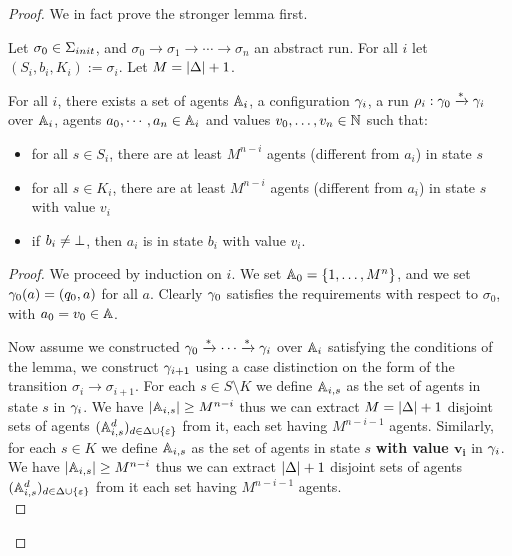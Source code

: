 \ifproofs
\begin{proof}

We in fact prove the stronger lemma first.

\begin{lemma}
	\label{lem:correctness-construction}
	
	
	Let $\sigma_0 \in \aconfiginitset$, and $\sigma_0 \to \sigma_1 \to \cdots \to \sigma_n$ an abstract run. For all $i$ let $(S_i, b_i, K_i) := \sigma_i$. Let $M = |\Delta|+1$.
	
	For all $i$, there exists a set of agents $\mathbb{A}_i$, a configuration $\gamma_i$, a run $\rho_i : \gamma_0 \xrightarrow{*} \gamma_i$ over $\mathbb{A}_i$, agents $a_0, \cdots, a_n \in \mathbb{A}_i$ and values $v_0, \ldots, v_n \in \mathbb{N}$ such that:
	\begin{itemize}
		\item for all $s \in S_i$, there are at least $M^{n-i}$ agents (different from $a_i$) in state $s$ 
		
		\item for all $s \in K_i$, there are at least $M^{n-i}$ agents (different from $a_i$) in state $s$ with value $v_i$
		
		\item if $b_i \neq \bot$, then $a_i$ is in state $b_i$ with value $v_i$.
	\end{itemize}
\end{lemma}

\ifproofs
\begin{proof}
	
	We proceed by induction on $i$.
	We set $\mathbb{A}_0 = \{1, \ldots, M^n\}$, and we set $\gamma_0(a) = (q_0, a)$ for all $a$. Clearly $\gamma_0$ satisfies the requirements with respect to $\sigma_0$, with $a_0 = v_0 \in \mathbb{A}$.
	
	Now assume we constructed $\gamma_0 \xrightarrow{*} \cdots \xrightarrow{*} \gamma_{i}$ over $\mathbb{A}_i$ satisfying the conditions of the lemma, we construct $\gamma_{i+1}$ using a case distinction on the form of the transition $\sigma_i \to \sigma_{i+1}$.
	For each $s \in S\setminus K$ we define $\mathbb{A}_{i,s}$ as the set of agents in state $s$ in $\gamma_{i}$. We have $|\mathbb{A}_{i,s}| \geq M^{n-i}$ thus we can extract $M = |\Delta|+1$ disjoint sets of agents $(\mathbb{A}_{i,s}^d)_{d \in \Delta\cup\{\varepsilon\}}$ from it, each set having $M^{n-i-1}$ agents.
	Similarly, for each $s \in K$ we define $\mathbb{A}_{i,s}$ as the set of agents in state $s$ \textbf{with value $\mathbf{v_i}$} in $\gamma_{i}$. We have $|\mathbb{A}_{i,s}| \geq M^{n-i}$ thus we can extract $|\Delta|+1$ disjoint sets of agents $(\mathbb{A}_{i,s}^d)_{d \in \Delta\cup\{\varepsilon\}}$ from it each set having $M^{n-i-1}$ agents.
	\\
	

\end{proof}
\end{proof}
